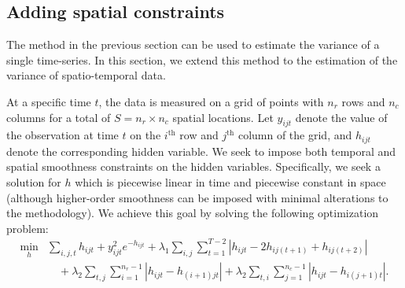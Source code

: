 \documentclass{article}
\newcommand{\attn}[1]{\textcolor{red}{TODO: #1}}
\begin{document}

\subsection{Adding spatial constraints}
\label{sec:exten}

The method in the previous section can be used to estimate the
variance of a single time-series. In this section, we extend this
method to the estimation of the variance of spatio-temporal data. 

At a specific time $t$, the data is measured on a grid of points with
$n_r$ rows and $n_c$ columns for a total of $S=n_r\times n_c$ spatial
locations. Let $y_{ijt}$ denote the value of the 
observation at time $t$ on the $i^\text{th}$ row and $j^\text{th}$
column of the grid, and $h_{ijt}$ denote the corresponding hidden
variable. We seek to impose both temporal and spatial smoothness
constraints on the hidden variables. Specifically, we seek a solution
for $h$ which is piecewise linear in time and piecewise constant in
space (although higher-order smoothness can be imposed with minimal
alterations to the methodology). We achieve this goal
by solving the following optimization problem: 
\begin{align}
\min_h &\sum_{i,j,t}h_{ijt}+y_{ijt}^2e^{-h_{ijt}}
+\lambda_1 \sum_{i,j} \sum_{t=1}^{T-2} \left|h_{ijt}-2h_{ij(t+1)}+h_{ij(t+2)}\right|\\
&\quad+\lambda_2 \sum_{t,j} \sum_{i=1}^{n_r-1} \left|h_{ijt}-h_{(i+1)jt}\right|
+\lambda_2 \sum_{t,i} \sum_{j=1}^{n_c-1} \left|h_{ijt}-h_{i(j+1)t}\right|
\label{eq:l1tf_var_st}.
\end{align}
\end{document}
